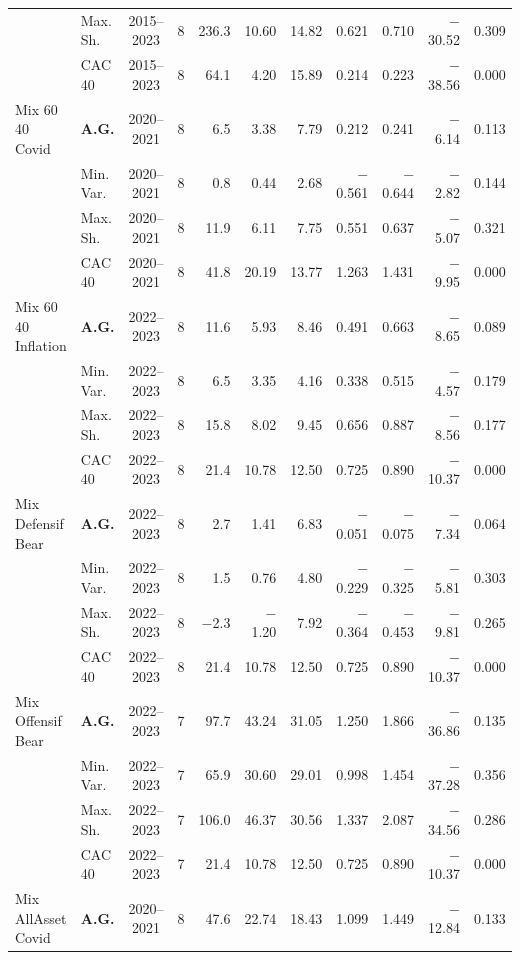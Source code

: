 \begin{longtable}{p{2.6cm} l c c r r r r r r r}
 & Max.\,Sh. & 2015--2023 & 8 & 236.3 & 10.60 & 14.82 & 0.621 & 0.710 & $-$30.52 & 0.309 \\
 & CAC 40 & 2015--2023 & 8 & 64.1 & 4.20 & 15.89 & 0.214 & 0.223 & $-$38.56 & 0.000 \\
\midrule
Mix 60 40 Covid & \textbf{A.G.} & 2020--2021 & 8 & 6.5 & 3.38 & 7.79 & 0.212 & 0.241 & $-$6.14 & 0.113 \\
 & Min.\,Var. & 2020--2021 & 8 & 0.8 & 0.44 & 2.68 & $-$0.561 & $-$0.644 & $-$2.82 & 0.144 \\
 & Max.\,Sh. & 2020--2021 & 8 & 11.9 & 6.11 & 7.75 & 0.551 & 0.637 & $-$5.07 & 0.321 \\
 & CAC 40 & 2020--2021 & 8 & 41.8 & 20.19 & 13.77 & 1.263 & 1.431 & $-$9.95 & 0.000 \\
\midrule
Mix 60 40 Inflation & \textbf{A.G.} & 2022--2023 & 8 & 11.6 & 5.93 & 8.46 & 0.491 & 0.663 & $-$8.65 & 0.089 \\
 & Min.\,Var. & 2022--2023 & 8 & 6.5 & 3.35 & 4.16 & 0.338 & 0.515 & $-$4.57 & 0.179 \\
 & Max.\,Sh. & 2022--2023 & 8 & 15.8 & 8.02 & 9.45 & 0.656 & 0.887 & $-$8.56 & 0.177 \\
 & CAC 40 & 2022--2023 & 8 & 21.4 & 10.78 & 12.50 & 0.725 & 0.890 & $-$10.37 & 0.000 \\
\midrule
Mix Defensif Bear & \textbf{A.G.} & 2022--2023 & 8 & 2.7 & 1.41 & 6.83 & $-$0.051 & $-$0.075 & $-$7.34 & 0.064 \\
 & Min.\,Var. & 2022--2023 & 8 & 1.5 & 0.76 & 4.80 & $-$0.229 & $-$0.325 & $-$5.81 & 0.303 \\
 & Max.\,Sh. & 2022--2023 & 8 & $-$2.3 & $-$1.20 & 7.92 & $-$0.364 & $-$0.453 & $-$9.81 & 0.265 \\
 & CAC 40 & 2022--2023 & 8 & 21.4 & 10.78 & 12.50 & 0.725 & 0.890 & $-$10.37 & 0.000 \\
\midrule
Mix Offensif Bear & \textbf{A.G.} & 2022--2023 & 7 & 97.7 & 43.24 & 31.05 & 1.250 & 1.866 & $-$36.86 & 0.135 \\
 & Min.\,Var. & 2022--2023 & 7 & 65.9 & 30.60 & 29.01 & 0.998 & 1.454 & $-$37.28 & 0.356 \\
 & Max.\,Sh. & 2022--2023 & 7 & 106.0 & 46.37 & 30.56 & 1.337 & 2.087 & $-$34.56 & 0.286 \\
 & CAC 40 & 2022--2023 & 7 & 21.4 & 10.78 & 12.50 & 0.725 & 0.890 & $-$10.37 & 0.000 \\
\midrule
Mix AllAsset Covid & \textbf{A.G.} & 2020--2021 & 8 & 47.6 & 22.74 & 18.43 & 1.099 & 1.449 & $-$12.84 & 0.133 \\

\end{longtable}
